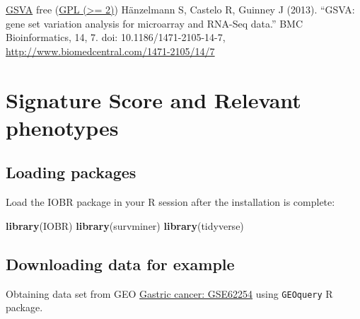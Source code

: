 \documentclass[
  12pt,
]{book}
\newenvironment{Shaded}{\begin{snugshade}}{\end{snugshade}}
\newcommand{\FunctionTok}[1]{\textcolor[rgb]{0.13,0.29,0.53}{\textbf{#1}}}
\newcommand{\NormalTok}[1]{#1}
\begin{document}
\href{http://www.bioconductor.org/packages/release/bioc/html/GSVA.html}{GSVA} free (\href{https://github.com/rcastelo/GSVA}{GPL (\textgreater= 2)}) Hänzelmann S, Castelo R, Guinney J (2013). ``GSVA: gene set variation analysis for microarray and RNA-Seq data.'' BMC Bioinformatics, 14, 7. doi: 10.1186/1471-2105-14-7, \url{http://www.biomedcentral.com/1471-2105/14/7}

\hypertarget{signature-score-and-relevant-phenotypes}{%
\chapter{\texorpdfstring{\textbf{Signature Score and Relevant phenotypes}}{Signature Score and Relevant phenotypes}}\label{signature-score-and-relevant-phenotypes}}

\hypertarget{loading-packages-3}{%
\section{Loading packages}\label{loading-packages-3}}

Load the IOBR package in your R session after the installation is complete:

\begin{Shaded}
\begin{Highlighting}[]
\FunctionTok{library}\NormalTok{(IOBR)}
\FunctionTok{library}\NormalTok{(survminer)}
\FunctionTok{library}\NormalTok{(tidyverse)}
\end{Highlighting}
\end{Shaded}

\hypertarget{downloading-data-for-example-2}{%
\section{Downloading data for example}\label{downloading-data-for-example-2}}

Obtaining data set from GEO \href{https://pubmed.ncbi.nlm.nih.gov/25894828/}{Gastric cancer: GSE62254} using \texttt{GEOquery} R package.
\end{document}
